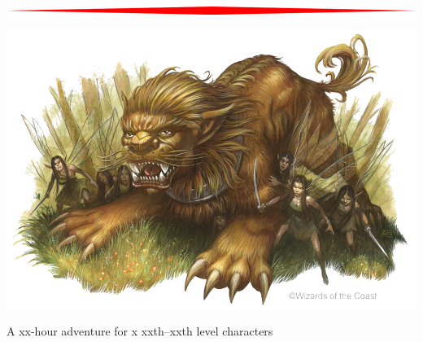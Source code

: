 
\begin{titlepage}
    \begin{onecolumn}
        \begin{center}
            {\Huge \booktitle}
            
            \vspace{0.5cm}
            \includegraphics[width=\textwidth]{images/hr.png}
            
            \vspace{0.5cm}
            {\huge \booksubtitle}
            
            \vspace{0.5cm}

            \includegraphics[width=\textwidth]{images/foo.png}
            
            \vspace{0.5cm}
            \lipsum[1] %
            
            \vspace{0.5cm}
            {\Large A xx-hour adventure for x xxth--xxth level characters}


\end{center}
\end{onecolumn}
\end{titlepage}
